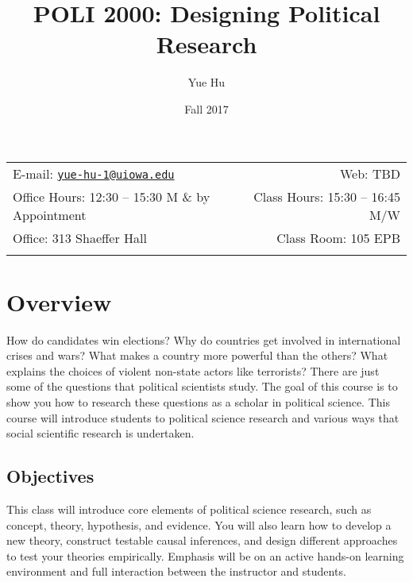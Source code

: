 \documentclass[11pt,]{article}
\title{POLI 2000: Designing Political Research}
\author{Yue Hu}
\date{Fall 2017}
\theoremstyle{definition}
\theoremstyle{definition}
\theoremstyle{remark}
\begin{document}
  

		\maketitle
		
	
		\thispagestyle{firststyle}



	\noindent \begin{tabular*}{\textwidth}{ @{\extracolsep{\fill}} lr @{\extracolsep{\fill}}}


E-mail: \texttt{\href{mailto:yue-hu-1@uiowa.edu}{\nolinkurl{yue-hu-1@uiowa.edu}}} & Web: TBD\\
Office Hours: 12:30 -- 15:30 M \& by Appointment  &  Class Hours: 15:30 -- 16:45 M/W\\
Office: 313 Shaeffer Hall  & Class Room: 105 EPB\\
	&  \\
	\hline
	\end{tabular*}
	
\vspace{2mm}
	


\section{Overview}\label{overview}

How do candidates win elections? Why do countries get involved in
international crises and wars? What makes a country more powerful than
the others? What explains the choices of violent non-state actors like
terrorists? There are just some of the questions that political
scientists study. The goal of this course is to show you how to research
these questions as a scholar in political science. This course will
introduce students to political science research and various ways that
social scientific research is undertaken.

\subsection{Objectives}\label{objectives}

This class will introduce core elements of political science research,
such as concept, theory, hypothesis, and evidence. You will also learn
how to develop a new theory, construct testable causal inferences, and
design different approaches to test your theories empirically. Emphasis
will be on an active hands-on learning environment and full interaction
between the instructor and students.
\end{document}

